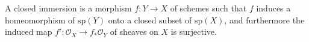 A closed immersion is a morphism $f: Y \rightarrow X$ of schemes such that $f$ induces a homeomorphism of $\text{sp}(Y)$ onto a closed subset of $\text{sp}(X)$, and furthermore the induced map $f': \mathcal{O}_X \rightarrow f_*\mathcal{O}_Y$ of sheaves on $X$ is surjective.
